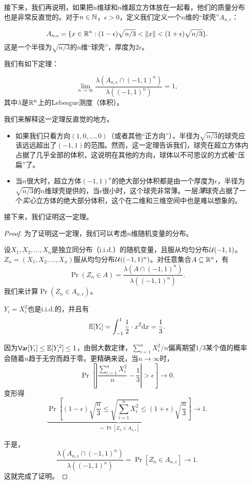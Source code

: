接下来，我们再说明，如果把$n$维球和$n$维超立方体放在一起看，他们的质量分布也是非常反直觉的。对于$n \in \mathbb{N}$，$\epsilon>0$，定义我们定义一个$n$维的“球壳”$A_{n,\epsilon}$：

\[A_{n,\epsilon} = \{x \in \mathbb{R}^n:(1-\epsilon)\sqrt{n/3}<\left\|x\right\|<(1+\epsilon)\sqrt{n/3}\}.\]
这是一个半径为$\sqrt{n/3}$的$n$维“球壳”，厚度为$2\epsilon$。

我们有如下定理：
\begin{theorem}
\[\lim_{n\to \infty} \frac{\lambda (A_{n,\epsilon}\cap (-1,1)^n)}{\lambda((-1,1)^n)} = 1,\]
其中$\lambda$是$\mathbb{R}^n$上的Lebesgue测度（体积）。
\end{theorem}

我们来解释这一定理反直觉的地方。
\begin{itemize}
    \item 如果我们只看方向$(1,0,\dots,0)$（或者其他“正方向”），半径为$\sqrt{n/3}$的球壳应该远远超出了$(-1,1)$的范围。然而，这一定理告诉我们，球壳在超立方体内占据了几乎全部的体积，这说明在其他的方向，球体以不可思议的方式被“压扁”了。
    \item 当$n$很大时，超立方体$(-1,1)^n$的绝大部分体积都是由一个厚度为$\epsilon$，半径为$\sqrt{n/3}$的$n$维球壳提供的，当$\epsilon$很小时，这个球壳非常薄。一层\emph{薄}球壳占据了一个\emph{实心}立方体的绝大部分体积，这个在二维和三维空间中也是难以想象的。
\end{itemize}

接下来，我们证明这一定理。
\begin{proof}

为了证明这一定理，我们可以考虑$n$维随机变量的分布。

设$X_1, X_2, \dots, X_n$是独立同分布（i.i.d.）的随机变量，且服从均匀分布$\mathcal{U}(-1,1)$。$Z_n=(X_1,X_2,\dots,X_n)$服从均匀分布$\mathcal{U}((-1,1)^n)$。对任意集合$A\subseteq \mathbb{R}^n$，有
\[\Pr(Z_n\in A) = \frac{\lambda(A\cap (-1,1)^n)}{\lambda((-1,1)^n)}.\]
我们来计算$\Pr(Z_n\in A_{n,\epsilon})$。

$Y_i=X_i^2$也是i.i.d.的，并且有\[\mathbb{E}[Y_i] = \int_{-1}^1 \frac{1}{2}\cdot x^2 \mathrm{d} x = \frac{1}{3}.\]

因为$\mathsf{Var}[Y_i]\leq \mathbb{E}[Y_i^2] \leq 1$，由弱大数定律，$\sum_{i=1}^n X_i^2/n$偏离期望$1/3$某个值的概率会随着$n$趋于无穷而趋于零。更精确来说，当$n\to \infty$时，
\[
\Pr\left[\left|\frac{\sum_{i=1}^n X_i^2}{n}-\frac{1}{3}\right|>\epsilon\right]\to 0.
\]
变形得
\[
\underbrace{\Pr\left[(1-\epsilon)\sqrt{\frac{n}{3}}\leq \sqrt{\sum_{i=1}^nX_i^2}\leq (1+\epsilon)\sqrt{\frac{n}{3}}\right]}_{=\Pr\left[Z_n \in A_{n,\epsilon}\right]}\to 1.
\]

于是，
\[
\frac{\lambda (A_{n,\epsilon}\cap (-1,1)^n)}{\lambda((-1,1)^n)}=\Pr\left[Z_n \in A_{n,\epsilon}\right]\to 1.
\]
这就完成了证明。
\end{proof}


